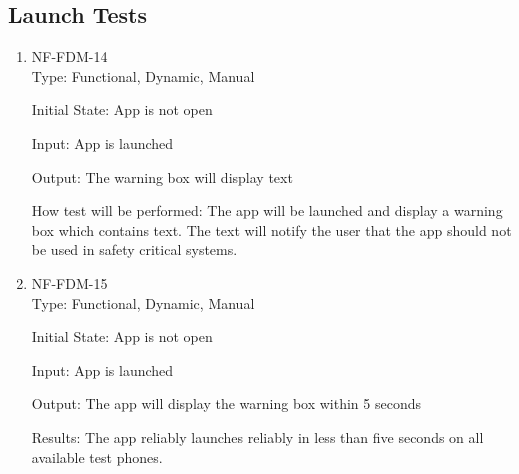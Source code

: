 \documentclass[12pt, titlepage]{article}
\begin{document}
\subsection{Launch Tests}
\begin{enumerate}
\item{NF-FDM-14\\}
Type: Functional, Dynamic, Manual
					
Initial State: 
App is not open
					
Input: 
App is launched
					
Output: 
The warning box will display text
					
How test will be performed: 
The app will be launched and display a warning box which contains text. The text will notify the user that the app should not be used in safety critical systems.

\item{NF-FDM-15\\}
Type: Functional, Dynamic, Manual
					
Initial State: 
App is not open
					
Input: 
App is launched
					
Output: 
The app will display the warning box within 5 seconds
					
Results: 
The app reliably launches reliably in less than five seconds on all available test phones. 


\end{enumerate}
\end{document}
